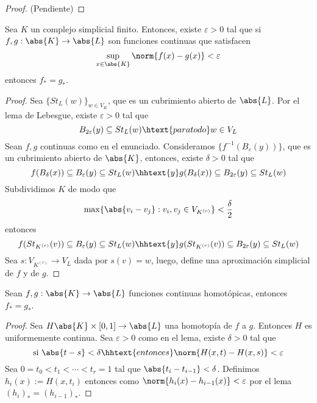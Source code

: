 \documentclass{article}
\begin{document}
\begin{proof}
    (Pendiente)
\end{proof}

\begin{lema}
    Sea $K$ un complejo simplicial finito. Entonces, existe $\varepsilon>0$ tal que si 
    $f,g:\abs{K}\to\abs{L}$ son funciones continuas que satisfacen
    \begin{equation*}
        \sup_{x\in\abs{K}}\norm{f(x)-g(x)}<\varepsilon
    \end{equation*}
    entonces $f_{*}=g_{*}$.
\end{lema}

\begin{proof}
    Sea $\{St_{L}(w)\}_{w\in V_{K}}$, que es un cubrimiento abierto de $\abs{L}$. Por el lema de
    Lebesgue, existe $\varepsilon>0$ tal que
    \begin{equation*}
        B_{2\varepsilon}(y)\subseteq St_{L}(w)\htext{para todo}w\in V_{L}
    \end{equation*}
    Sean $f,g$ continuas como en el enunciado. Consideramos $\{f^{-1}(B_{\varepsilon}(y))\}$, que
    es un cubrimiento abierto de $\abs{K}$, entonces, existe $\delta>0$ tal que
    \begin{equation*}
        f(B_{\delta}(x))\subseteq B_{\varepsilon}(y)\subseteq St_{L}(w)
        \hhtext{y}
        g(B_{\delta}(x))\subseteq B_{2\varepsilon}(y)\subseteq St_{L}(w)
    \end{equation*}
    Subdividimos $K$ de modo que
    \begin{equation*}
        \max\{\abs{v_{i}-v_{j}}:v_{i},v_{j}\in V_{K^{(r)}}\}<\frac{\delta}{2}
    \end{equation*}
    entonces
    \begin{equation*}
        f(St_{K^{(r)}}(v))\subseteq B_{\varepsilon}(y)\subseteq St_{L}(w)
        \hhtext{y}
        g(St_{K^{(r)}}(v))\subseteq B_{2\varepsilon}(y)\subseteq St_{L}(w)
    \end{equation*}
    Sea $s:V_{K^{(r)}}\to V_{L}$ dada por $s(v)=w$, luego, define una aproximación simplicial de
    $f$ y de $g$.
\end{proof}

\begin{teo}
    Sean $f,g:\abs{K}\to\abs{L}$ funciones continuas homotópicas, entonces $f_{*}=g_{*}$.
\end{teo}

\begin{proof}
    Sea $H\abs{K}\times[0,1]\to\abs{L}$ una homotopía de $f$ a $g$. Entonces $H$ es uniformemente
    continua. Sea $\varepsilon>0$ como en el lema, existe $\delta>0$ tal que
    \begin{equation*}
        \text{si }\abs{t-s}<\delta\hhtext{entonces}\norm{H(x,t)-H(x,s)}<\varepsilon
    \end{equation*}
    Sea $0=t_{0}<t_{1}<\cdots<t_{r}=1$ tal que $\abs{t_{i}-t_{i-1}}<\delta$. Definimos 
    $h_{i}(x):=H(x,t_{i})$ entonces como $\norm{h_{i}(x)-h_{i-1}(x)}<\varepsilon$ por el lema
    $(h_{i})_{*}=(h_{i-1})_{*}$.
\end{proof}
\end{document}
